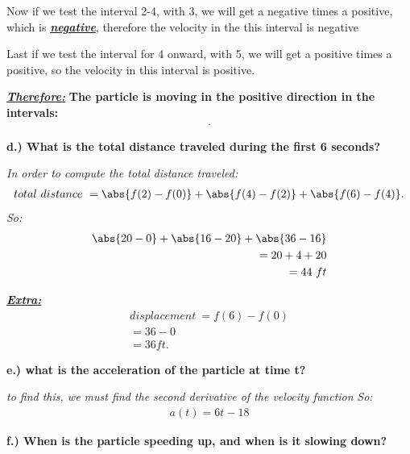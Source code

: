 \documentclass{report}
\begin{document}
   \bigbreak \noindent 
   Now if we test the interval 2-4, with 3, we will get a negative times a positive, which is \textbf{\textit{\underline{negative}}}, therefore the 
   velocity in the this interval is negative

   \bigbreak \noindent 
   Last if we test the interval for 4 onward, with 5, we will get a positive times a positive, so the velocity in this 
   interval is positive.

   \bigbreak \noindent 
   \textbf{\textit{\underline{Therefore:}}}
   \bigbreak \noindent 
   \textbf{The particle is moving in the positive direction in the intervals:}
     \begin{align*}
       [0,2)\cup(4,\infty]
     .\end{align*}

   \bigbreak \noindent 

   \bigbreak \noindent 
   \textbf{d.) What is the total distance traveled during the first 6 seconds?}

   \bigbreak \noindent 
   \textit{In order to compute the total distance traveled:}
   \begin{align*}
     total\ distance\ = \abs{f(2)-f(0)} + \abs{f(4)- f(2)} + \abs{f(6)-f(4)}
   .\end{align*}
   \bigbreak \noindent
   \textit{So:}
   \begin{align*}
     \abs{20-0}+ \abs{16-20}+ \abs{36-16} \\
     = 20 + 4 + 20 \\
     = 44\ ft
   \end{align*}

   \bigbreak \noindent 
   \textbf{\textit{\underline{Extra:}}}
   \begin{align*}
     displacement\ = f(6) - f(0) \\
     = 36-0 \\
     = 36ft
   .\end{align*}

   \bigbreak \noindent 
   \textbf{e.) what is the acceleration of the particle at time t?}

   \bigbreak \noindent 
   \textit{to find this, we must find the second derivative of the velocity function}
   \bigbreak \noindent
   \textit{So:}
   \begin{align*}
     a(t) = 6t-18
   \end{align*}

   \bigbreak \noindent 
   \textbf{f.) When is the particle speeding up, and when is it slowing down?}
\end{document}
